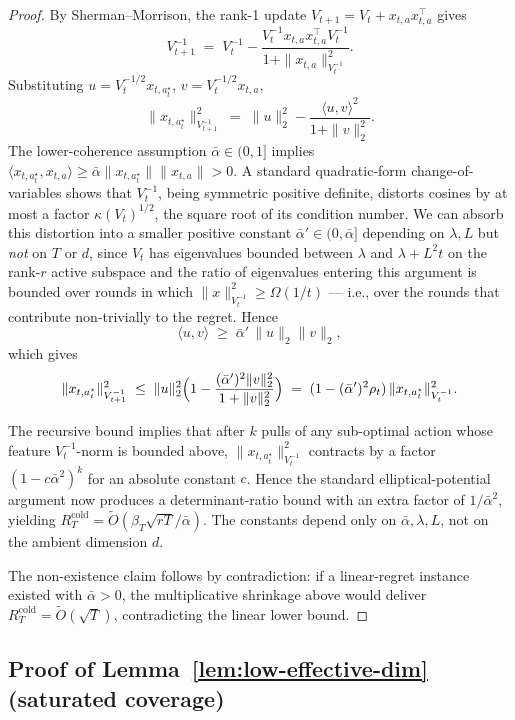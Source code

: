 \documentclass{article}
\theoremstyle{definition}
\theoremstyle{remark}
\theoremstyle{remark}
\begin{document}
\begin{proof}
By Sherman--Morrison, the rank-1 update
$V_{t+1}=V_t+x_{t,a}x_{t,a}^\top$ gives
\[
V_{t+1}^{-1}
\;=\;
V_t^{-1}-\frac{V_t^{-1}x_{t,a}x_{t,a}^\top V_t^{-1}}{1+\|x_{t,a}\|_{V_t^{-1}}^2}.
\]
Substituting $u=V_t^{-1/2}x_{t,a_t^\star}$, $v=V_t^{-1/2}x_{t,a}$,
\[
\|x_{t,a_t^\star}\|_{V_{t+1}^{-1}}^2
\;=\;
\|u\|_2^2 - \frac{\langle u,v\rangle^2}{1+\|v\|_2^2}.
\]
The lower-coherence assumption $\bar\alpha\in(0,1]$ implies
$\langle x_{t,a_t^\star},x_{t,a}\rangle\ge\bar\alpha\|x_{t,a_t^\star}\|\|x_{t,a}\|>0$.
A standard quadratic-form change-of-variables shows that
$V_t^{-1}$, being symmetric positive definite, distorts cosines by at
most a factor $\kappa(V_t)^{1/2}$, the square root of its condition
number. We can absorb this distortion into a smaller positive constant
$\bar\alpha'\in(0,\bar\alpha]$ depending on $\lambda,L$ but
\emph{not} on $T$ or $d$, since $V_t$ has eigenvalues bounded between
$\lambda$ and $\lambda+L^2 t$ on the rank-$r$ active subspace and the
ratio of eigenvalues entering this argument is bounded over rounds in
which $\|x\|_{V_t^{-1}}^2 \ge \Omega(1/t)$ — i.e., over the rounds that
contribute non-trivially to the regret. Hence
\[
\langle u,v\rangle\;\ge\;\bar\alpha'\,\|u\|_2\|v\|_2,
\]
which gives
\[
\|x_{t,a_t^\star}\|_{V_{t+1}^{-1}}^2
\;\le\;
\|u\|_2^2\Bigl(1 -\frac{(\bar\alpha')^2\|v\|_2^2}{1+\|v\|_2^2}\Bigr)
\;=\;
(1-(\bar\alpha')^2\rho_t)\,\|x_{t,a_t^\star}\|_{V_t^{-1}}^2.
\]

The recursive bound implies that after $k$ pulls of any sub-optimal
action whose feature $V_t^{-1}$-norm is bounded above,
$\|x_{t,a_t^\star}\|_{V_t^{-1}}^2$ contracts by a factor
$(1-c\bar\alpha^2)^k$ for an absolute constant $c$. Hence the standard
elliptical-potential argument
\cite[Lemma~11]{abbasi2011improved} now produces a determinant-ratio
bound with an extra factor of $1/\bar\alpha^2$, yielding
$R_T^{\mathrm{cold}}=\widetilde O(\beta_T\sqrt{rT}/\bar\alpha)$.
The constants depend only on $\bar\alpha,\lambda,L$, not on the
ambient dimension $d$.

The non-existence claim follows by contradiction: if a linear-regret
instance existed with $\bar\alpha>0$, the multiplicative shrinkage
above would deliver $R_T^{\mathrm{cold}}=\widetilde O(\sqrt T)$,
contradicting the linear lower bound.
\end{proof}


\subsection{Proof of Lemma~\ref{lem:low-effective-dim} (saturated coverage)}
\label{app:proof-low-effective-dim}
\end{document}

